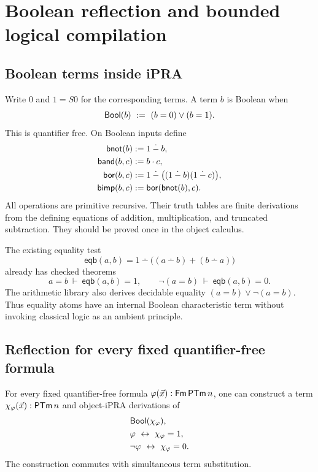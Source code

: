 
\section{Boolean reflection and bounded logical compilation}
\label{sec:boolean}

\subsection{Boolean terms inside iPRA}

Write \(0\) and \(1=S0\) for the corresponding terms.  A term \(b\) is
Boolean when
\[
       \mathsf{Bool}(b)\ \defeq\ (b=0)\vee(b=1).
\]
This is quantifier free.  On Boolean inputs define
\[
\begin{aligned}
 \mathsf{bnot}(b) &\mathrel{:=} 1\mathbin{\mathbin{\dot{-}}} b,\\
 \mathsf{band}(b,c) &\mathrel{:=} b\cdot c,\\
 \mathsf{bor}(b,c) &\mathrel{:=}
   1\mathbin{\mathbin{\dot{-}}}
      \bigl((1\mathbin{\mathbin{\dot{-}}}b)
            (1\mathbin{\mathbin{\dot{-}}}c)\bigr),\\
 \mathsf{bimp}(b,c) &\mathrel{:=}
   \mathsf{bor}(\mathsf{bnot}(b),c).
\end{aligned}
\]
All operations are primitive recursive.  Their truth tables are finite
derivations from the defining equations of addition, multiplication, and
truncated subtraction.  They should be proved once in the object calculus.

The existing equality test
\[
 \mathsf{eqb}(a,b)
   =1\mathbin{\dotminus}
      \bigl((a\mathbin{\dotminus}b)
            +(b\mathbin{\dotminus}a)\bigr)
\]
already has checked theorems
\[
  a=b\ \vdash\ \mathsf{eqb}(a,b)=1,
  \qquad
  \neg(a=b)\ \vdash\ \mathsf{eqb}(a,b)=0.
\]
The arithmetic library also derives decidable equality
\((a=b)\vee\neg(a=b)\).  Thus equality atoms have an internal Boolean
characteristic term without invoking classical logic as an ambient principle.

\subsection{Reflection for every fixed quantifier-free formula}

\begin{theorem}
For every fixed quantifier-free formula
\(\varphi(\vec x):\mathsf{Fm}\,\mathsf{PTm}\,n\), one can construct a term
\(\chi_\varphi(\vec x):\mathsf{PTm}\,n\) and object-iPRA derivations of
\[
\begin{aligned}
 &\mathsf{Bool}(\chi_\varphi),\\
 &\varphi\ \leftrightarrow\ \chi_\varphi=1,\\
 &\neg\varphi\ \leftrightarrow\ \chi_\varphi=0.
\end{aligned}
\]
The construction commutes with simultaneous term substitution.
\end{theorem}

